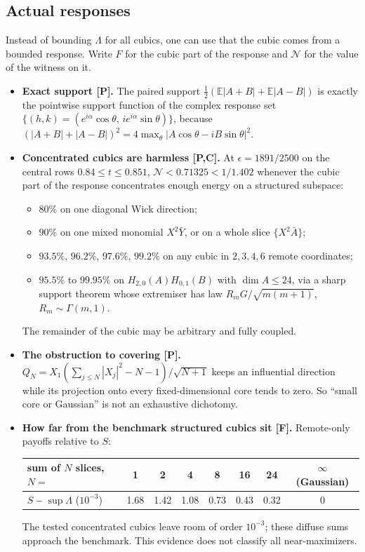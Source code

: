 \documentclass[11pt,a4paper]{article}
\newcommand{\E}{\mathbb{E}}
\begin{document}
\subsection{Actual responses}
Instead of bounding $\Lambda$ for all cubics, one can use that the cubic comes from a bounded response. Write $F$ for the
cubic part of the response and $\mathcal N$ for the value of the witness on it.
\begin{itemize}
\item \textbf{Exact support [P].} The paired support $\frac12(\E|A+B|+\E|A-B|)$ is exactly the pointwise support function
 of the complex response set $\{(h,k)=(e^{i\alpha}\cos\theta,\,ie^{i\alpha}\sin\theta)\}$, because
 $(|A+B|+|A-B|)^2=4\max_\theta|A\cos\theta-iB\sin\theta|^2$.
\item \textbf{Concentrated cubics are harmless [P,C].} At $\epsilon=1891/2500$ on the central rows $0.84\le t\le0.851$,
 $\mathcal N<0.71325<1/1.402$ whenever the cubic part of the response concentrates enough energy on a structured subspace:
 \begin{itemize}
 \item $80\%$ on one diagonal Wick direction;
 \item $90\%$ on one mixed monomial $X^2\bar Y$, or on a whole slice $\{X^2\bar A\}$;
 \item $93.5\%$, $96.2\%$, $97.6\%$, $99.2\%$ on any cubic in $2,3,4,6$ remote coordinates;
 \item $95.5\%$ to $99.95\%$ on $H_{2,0}(A)H_{0,1}(B)$ with $\dim A\le24$, via a sharp support theorem whose extremiser has law
  $R_mG/\sqrt{m(m+1)}$, $R_m\sim\Gamma(m,1)$.
 \end{itemize}
 The remainder of the cubic may be arbitrary and fully coupled.
\item \textbf{The obstruction to covering [P].} $Q_N=X_1(\sum_{j\le N}|X_j|^2-N-1)/\sqrt{N+1}$ keeps an influential direction
 while its projection onto every fixed-dimensional core tends to zero. So ``small core or Gaussian'' is not an exhaustive
 dichotomy.
\item \textbf{How far from the benchmark structured cubics sit [F].} Remote-only payoffs relative to $S$:
 \begin{center}\small
 \begin{tabular}{@{}lccccccc@{}}\toprule
 sum of $N$ slices, $N=$ & 1 & 2 & 4 & 8 & 16 & 24 & $\infty$ (Gaussian)\\\midrule
 $S-\sup\Lambda$ ($10^{-3}$) & 1.68 & 1.42 & 1.08 & 0.73 & 0.43 & 0.32 & 0\\\bottomrule
 \end{tabular}
 \end{center}
 The tested concentrated cubics leave room of order $10^{-3}$; these diffuse sums approach the benchmark.
 This evidence does not classify all near-maximizers.
\end{itemize}
\end{document}
